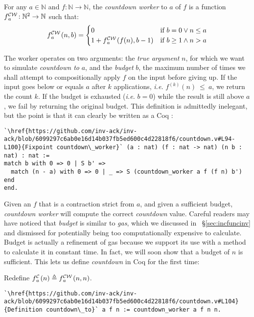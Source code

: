\begin{defn} \label{defn: countdown-worker} \label{lem: cdt-init}
For any $a\in \mathbb{N}$ and $f: \mathbb{N}\to \mathbb{N}$, the \emph{countdown worker} to $a$ of $f$ is a function $\cdw{f}{a}\ : \mathbb{N}^2\to \mathbb{N}$ such that:
\begin{equation*}
\cdw{f}{a}(n, b) = \begin{cases}
0 & \text{if } b = 0 \vee n\le a \\ 1 +\cdw{f}{a}(f(n), b-1) & \text{if } b \ge 1 \wedge n > a
\end{cases}
\end{equation*}
\end{defn}
The worker operates on two arguments: 
the \emph{true argument} $n$, for which we want to simulate 
\emph{countdown to} $a$, 
and the \emph{budget} $b$, the maximum number of times we shall attempt 
to compositionally apply $f$ on the input before giving up. 
If the input goes below or equals $a$ after $k$ applications, \emph{i.e.} $f^{(k)}(n)~\le~a$, we return the count $k$. If the budget is exhausted (\emph{i.e.} $b = 0$) while the result is still above $a$, we fail by returning the original budget. This definition is admittedly inelegant, but the point is that it can clearly be written as a Coq :
\begin{lstlisting}
`\href{https://github.com/inv-ack/inv-ack/blob/6099297c6ab0e16d14b037fb5ed600c4d22818f6/countdown.v#L94-L100}{Fixpoint countdown\_worker}` (a : nat) (f : nat -> nat) (n b : nat) : nat :=
match b with 0 => 0 | S b' => 
  match (n - a) with 0 => 0 | _ => S (countdown_worker a f (f n) b') end
end.
\end{lstlisting}
Given an $f$ that is a contraction strict from $a$, 
and given a sufficient budget, \emph{countdown worker} 
will compute the correct \emph{countdown} value.  
Careful readers may have noticed that \emph{budget} is similar to 
\emph{gas}, which we discussed in ~\S\ref{sec:incfuncinv} 
and dismissed for potentially 
being too computationally expensive to calculate. 
Budget is actually a refinement of gas because 
we support its use with a method to calculate it in constant time.
In fact, we will soon show that a budget of $n$ is sufficient. 
This lets us define \emph{countdown} in Coq for the first time:
\begin{defn} \label{defn: countdown}
Redefine $\cdt{f}{a}(n) \triangleq \cdw{f}{a}(n, n)$.
\begin{lstlisting}
`\href{https://github.com/inv-ack/inv-ack/blob/6099297c6ab0e16d14b037fb5ed600c4d22818f6/countdown.v#L104}{Definition countdown\_to}` a f n := countdown_worker a f n n.
\end{lstlisting}
\vspace{-0.8em}
\end{defn}
